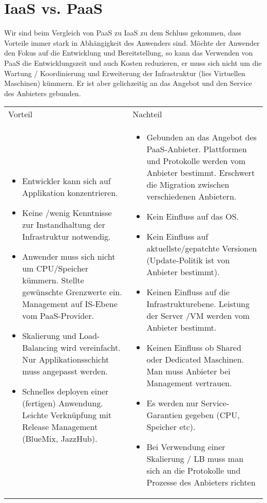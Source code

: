 \section{IaaS vs. PaaS}
Wir sind beim Vergleich von PaaS zu IaaS zu dem Schluss gekommen, dass Vorteile immer stark in
Abhängigkeit des Anwenders sind. Möchte der Anwender den Fokus auf die Entwicklung und
Bereitstellung, so kann das Verwenden von PaaS die Entwicklungszeit und auch Kosten reduzieren, er
muss sich nicht um die Wartung / Koordinierung und Erweiterung der Infrastruktur (lies Virtuellen
Maschinen) kümmern. Er ist aber gelichzeitig an das Angebot und den Service des Anbieters gebunden.

\begin{tabular}{p{7cm} p{7cm} }
Vorteil & Nachteil \\
\begin{itemize}
  \item Entwickler kann sich auf Applikation konzentrieren.
  \item Keine /wenig Kenntnisse zur Instandhaltung der Infrastruktur notwendig.
  \item Anwender muss sich nicht um CPU/Speicher kümmern. Stellte gewünschte Grenzwerte ein.
   Management auf IS-Ebene vom PaaS-Provider.
   \item Skalierung und Load-Balancing wird vereinfacht. Nur Applikationsschicht muss angepasst
   werden.
 \item Schnelles deployen einer (fertigen) Anwendung. Leichte Verknüpfung mit Release Management
 	(BlueMix, JazzHub).
\end{itemize}& 
\begin{itemize}
\item Gebunden an das Angebot des PaaS-Anbieter. Plattformen und Protokolle werden vom Anbieter
bestimmt.  Erschwert die Migration zwischen verschiedenen Anbietern.
\item Kein Einfluss auf das OS. 
\item Kein Einfluss auf aktuellste/gepatchte Versionen (Update-Politik ist von Anbieter bestimmt).
\item Keinen Einfluss auf die Infrastrukturebene. Leistung der Server /VM werden vom Anbieter bestimmt. 
\item Keinen Einfluss ob Shared oder Dedicated Maschinen. Man muss Anbieter bei Management vertrauen.
\item Es werden nur Service-Garantien gegeben (CPU, Speicher etc).
\item Bei Verwendung einer Skalierung / LB muss man sich an die Protokolle und Prozesse des Anbieters richten
\end{itemize}
\end{tabular}